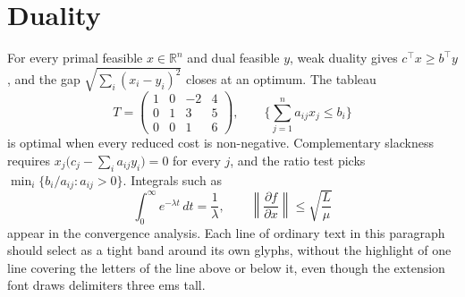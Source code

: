 \documentclass[10pt]{article}
\begin{document}
\section*{Duality}
For every primal feasible $x \in \mathbb{R}^n$ and dual feasible $y$, weak
duality gives $c^\top x \ge b^\top y$, and the gap $\sqrt{\sum_i (x_i - y_i)^2}$
closes at an optimum. The tableau
\[
  T = \left(\begin{array}{ccc|c} 1 & 0 & -2 & 4 \\ 0 & 1 & 3 & 5 \\ 0 & 0 & 1 & 6 \end{array}\right),
  \qquad
  \Bigg\{ \sum_{j=1}^{n} a_{ij} x_j \le b_i \Bigg\}
\]
is optimal when every reduced cost is non-negative. Complementary slackness
requires $x_j \bigl( c_j - \sum_i a_{ij} y_i \bigr) = 0$ for every $j$, and the
ratio test picks $\min_i \{ b_i / a_{ij} : a_{ij} > 0 \}$. Integrals such as
\[
  \int_0^\infty e^{-\lambda t}\, dt = \frac{1}{\lambda},
  \qquad
  \left\lVert \frac{\partial f}{\partial x} \right\rVert \le \sqrt{\frac{L}{\mu}}
\]
appear in the convergence analysis. Each line of ordinary text in this
paragraph should select as a tight band around its own glyphs, without the
highlight of one line covering the letters of the line above or below it,
even though the extension font draws delimiters three ems tall.
\end{document}

